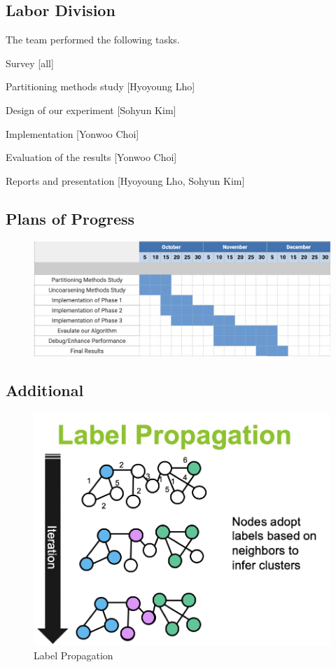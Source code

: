 
\subsection{Labor Division}
The team performed the following tasks.
\bit
\item Survey [all]
\item Partitioning methods study [Hyoyoung Lho]
\item Design of our experiment [Sohyun Kim]
\item Implementation [Yonwoo Choi]
\item Evaluation of the results [Yonwoo Choi]
\item Reports and presentation [Hyoyoung Lho, Sohyun Kim]
\eit

\subsection{Plans of Progress}
\begin{figure}[htb!]
    \centering
    \includegraphics[width=0.9\linewidth]{FIG/ganttchart.png}
    \label{fig:ganttchart}
\end{figure}

\newpage
\subsection{Additional}
\begin{figure}[htb!]
    \centering
    \includegraphics[width=0.5\linewidth]{FIG/lp.png}
    \caption{Label Propagation}
    \label{fig:lp}
\end{figure}

